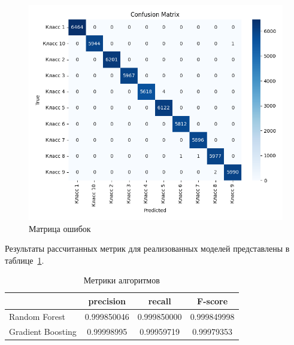 \begin{center}
    \begin{figure}[H]
        \includegraphics[scale=0.6]{pic/confusion_matrix.png}
        \caption{Матрица ошибок}
        \label{ris:confusion-matrix}
    \end{figure}
\end{center}
\vspace{1.5em}

Результаты рассчитанных метрик для реализованных моделей представлены в таблице~\ref{tabular:tableСomparison}.

\begin{table}[H]
    \onehalfspacing \caption{Метрики алгоритмов}
    \medskip
        \begin{tabular}{|l|c|c|c|}
        \hline
            \backslashbox{}{}  & precision & recall & F-score \\ \hline
            Random Forest & 0.999850046 & 0.999850000 & 0.999849998 \\  \hline 
            Gradient Boosting & 0.99998995 & 0.99959719 & 0.99979353 \\  \hline 
        \end{tabular}
    \label{tabular:tableСomparison}
\end{table}
